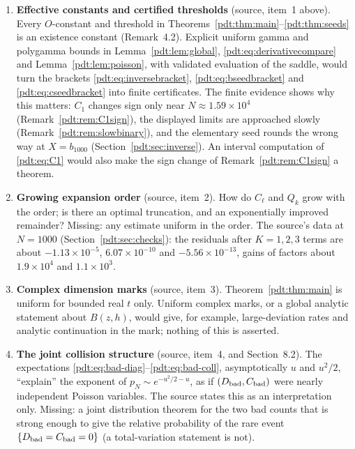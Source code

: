 \begin{enumerate}
\item\label{pdt:q:effective} \textbf{Effective constants and certified
 thresholds} (source, item~1 above). Every $O$-constant and threshold in
 Theorems~\ref{pdt:thm:main}--\ref{pdt:thm:seeds} is an existence constant
 (Remark~4.2). Explicit uniform gamma and polygamma bounds in
 Lemma~\ref{pdt:lem:global}, \eqref{pdt:eq:derivativecompare} and
 Lemma~\ref{pdt:lem:poisson}, with validated evaluation of the saddle,
 would turn the brackets \eqref{pdt:eq:inversebracket},
 \eqref{pdt:eq:bseedbracket} and \eqref{pdt:eq:cseedbracket} into finite
 certificates. The finite evidence shows why this matters: $C_1$ changes
 sign only near $N\approx1.59\times10^4$ (Remark~\ref{pdt:rem:C1sign}), the
 displayed limits are approached slowly (Remark~\ref{pdt:rem:slowbinary}),
 and the elementary seed rounds the wrong way at $X=b_{1000}$
 (Section~\ref{pdt:sec:inverse}). An interval computation of
 \eqref{pdt:eq:C1} would also make the sign change of
 Remark~\ref{pdt:rem:C1sign} a theorem.
\item\label{pdt:q:order} \textbf{Growing expansion order} (source,
 item~2). How do $C_\ell$ and $Q_k$ grow with the order; is there an
 optimal truncation, and an exponentially improved remainder? Missing:
 any estimate uniform in the order. The source's data at $N=1000$
 (Section~\ref{pdt:sec:checks}): the residuals after $K=1,2,3$ terms are
 about $-1.13\times10^{-5}$, $6.07\times10^{-10}$ and
 $-5.56\times10^{-13}$, gains of factors about $1.9\times10^4$ and
 $1.1\times10^3$.
\item\label{pdt:q:complex} \textbf{Complex dimension marks} (source,
 item~3). Theorem~\ref{pdt:thm:main} is uniform for bounded real $t$
 only. Uniform complex marks, or a global analytic statement about
 $B(z,h)$, would give, for example, large-deviation rates and analytic
 continuation in the mark; nothing of this is asserted.
\item\label{pdt:q:collision} \textbf{The joint collision structure}
 (source, item~4, and Section~8.2). The expectations
 \eqref{pdt:eq:bad-diag}--\eqref{pdt:eq:bad-coll}, asymptotically $u$ and
 $u^2/2$, ``explain'' the exponent of $p_N\sim e^{-u^2/2-u}$, as if
 $(D_{\rm bad},C_{\rm bad})$ were nearly independent Poisson variables.
 The source states this as an interpretation only. Missing: a joint
 distribution theorem for the two bad counts that is strong enough to give
 the relative probability of the rare event $\{D_{\rm bad}=C_{\rm bad}=0\}$
 (a total-variation statement is not).

\end{enumerate}
